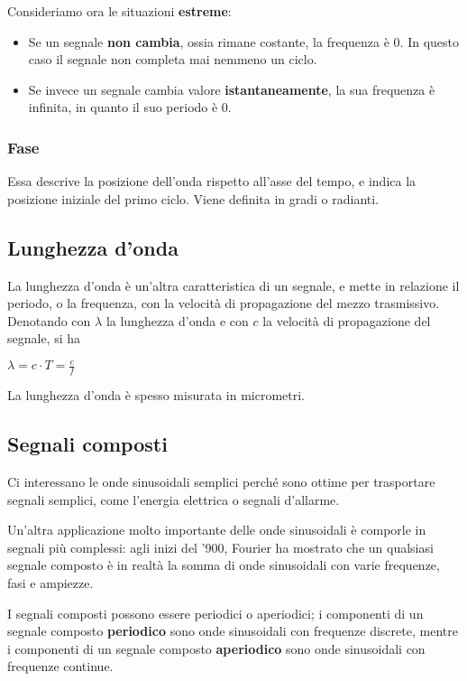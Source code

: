         Consideriamo ora le situazioni \textbf{estreme}:
        \begin{itemize}
            \item Se un segnale \textbf{non cambia}, ossia rimane costante, la frequenza è 0. In questo caso il segnale non completa mai nemmeno un ciclo.
                
            \item Se invece un segnale cambia valore \textbf{istantaneamente}, la sua frequenza è infinita, in quanto il suo periodo è 0.
        \end{itemize}
            
        \subsubsection{Fase}
            Essa descrive la posizione dell'onda rispetto all'asse del tempo, e indica la posizione iniziale del primo ciclo. Viene definita in gradi o radianti.
            
    \subsection{Lunghezza d'onda}
        La lunghezza d'onda è un'altra caratteristica di un segnale, e mette in relazione il periodo, o la frequenza, con la velocità di propagazione del mezzo trasmissivo. Denotando con $\lambda$ la lunghezza d'onda e con $c$ la velocità di propagazione del segnale, si ha
        \begin{center}
            $\lambda = c \cdot T = \frac{c}{f}$
        \end{center}
        
        La lunghezza d'onda è spesso misurata in micrometri.
        
    \subsection{Segnali composti}
        Ci interessano le onde sinusoidali semplici perché sono ottime per trasportare segnali semplici, come l'energia elettrica o segnali d'allarme.
        
        Un'altra applicazione molto importante delle onde sinusoidali è comporle in segnali più complessi: agli inizi del '900, Fourier ha mostrato che un qualsiasi segnale composto è in realtà la somma di onde sinusoidali con varie frequenze, fasi e ampiezze.
        
        I segnali composti possono essere periodici o aperiodici; i componenti di un segnale composto \textbf{periodico} sono onde sinusoidali con frequenze discrete, mentre i componenti di un segnale composto \textbf{aperiodico} sono onde sinusoidali con frequenze continue.
        
